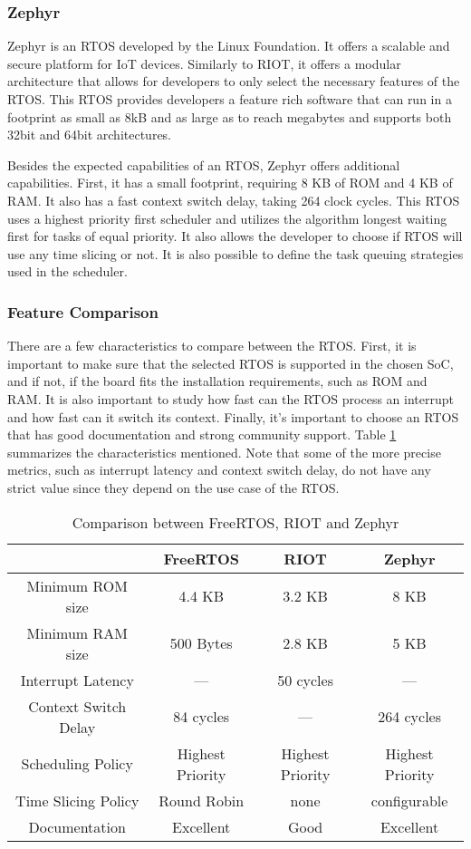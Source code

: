 \subsubsection{Zephyr}
Zephyr is an RTOS developed by the Linux Foundation. It offers a scalable and secure platform for IoT devices. Similarly to RIOT, it offers a modular architecture that allows for developers to only select the necessary features of the RTOS. This RTOS provides developers a feature rich software that can run in a footprint as small as 8kB and as large as to reach megabytes and supports both 32bit and 64bit architectures.

Besides the expected capabilities of an RTOS, Zephyr offers additional capabilities. First, it has a small footprint, requiring 8 KB of ROM and 4 KB of RAM. It also has a fast context switch delay, taking 264 clock cycles. This RTOS uses a highest priority first scheduler and utilizes the algorithm longest waiting first for tasks of equal priority. It also allows the developer to choose if RTOS will use any time slicing or not. It is also possible to define the task queuing strategies used in the scheduler. 

\subsubsection{Feature Comparison}
There are a few characteristics to compare between the RTOS. First, it is important to make sure that the selected RTOS is supported in the chosen SoC, and if not, if the board fits the installation requirements, such as ROM and RAM. It is also important to study how fast can the RTOS process an interrupt and how fast can it switch its context. Finally, it's important to choose an RTOS that has good documentation and strong community support. Table \ref{tab:comparação RTOS} summarizes the characteristics mentioned. Note that some of the more precise metrics, such as interrupt latency and context switch delay, do not have any strict value since they depend on the use case of the RTOS.


\begin{table}[H]
    \centering
    \begin{tabular}{ c | c | c | c }
          & FreeRTOS & RIOT & Zephyr \\ 
        \hline
        Minimum ROM size & 4.4 KB & 3.2 KB & 8 KB\\  
        Minimum RAM size & 500 Bytes & 2.8 KB & 5 KB\\ 
        \hline
        Interrupt Latency & --- & 50 cycles & ---\\
        Context Switch Delay & 84 cycles & --- & 264 cycles \\
        Scheduling Policy & Highest Priority & Highest Priority& Highest Priority\\
        Time Slicing Policy & Round Robin & none & configurable \\
        \hline
        Documentation & Excellent & Good & Excellent\\
    \end{tabular}
    \label{tab:comparação RTOS}
    \caption{Comparison between FreeRTOS, RIOT and Zephyr}
\end{table}

